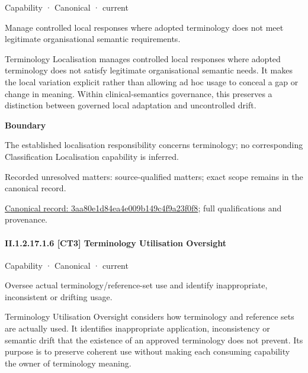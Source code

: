 \label{element:3aa80e1d84ea4e009b149c4f9a23f0f8}
{\small Capability · Canonical · current}\par

Manage controlled local responses where adopted terminology does not meet legitimate organisational semantic requirements.



Terminology Localisation manages controlled local responses where adopted terminology does not satisfy legitimate organisational semantic needs. It makes the local variation explicit rather than allowing ad hoc usage to conceal a gap or change in meaning. Within clinical-semantics governance, this preserves a distinction between governed local adaptation and uncontrolled drift.



\textbf{Boundary}



The established localisation responsibility concerns terminology; no corresponding Classification Localisation capability is inferred.


{\small Recorded unresolved matters: source-qualified matters; exact scope remains in the canonical record.}\par
{\footnotesize \href{../../../../continuum/strategy/capability/3aa80e1d84ea4e009b149c4f9a23f0f8.md}{Canonical record: 3aa80e1d84ea4e009b149c4f9a23f0f8}; full qualifications and provenance.}\par
\paragraph*{II.1.2.17.1.6 [CT3] Terminology Utilisation Oversight}
\label{navigation:II.1.2.17.1.6}

\label{element:4ca436cd90b745daa290b067c57a0450}
{\small Capability · Canonical · current}\par

Oversee actual terminology/reference-set use and identify inappropriate, inconsistent or drifting usage.



Terminology Utilisation Oversight considers how terminology and reference sets are actually used. It identifies inappropriate application, inconsistency or semantic drift that the existence of an approved terminology does not prevent. Its purpose is to preserve coherent use without making each consuming capability the owner of terminology meaning.



